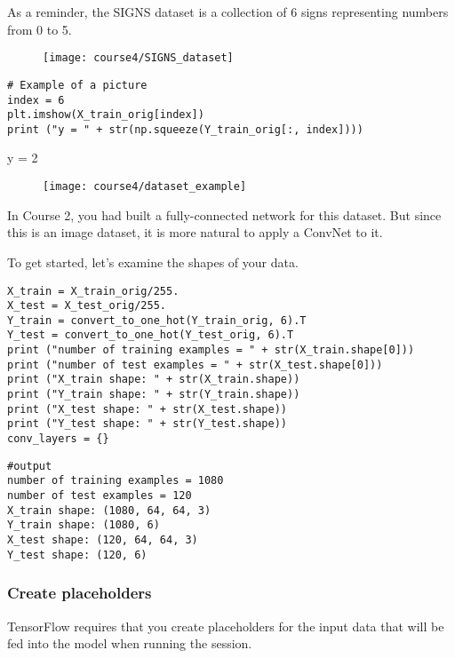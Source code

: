 As a reminder, the SIGNS dataset is a collection of 6 signs representing numbers from 0 to 5.
\clearpage
\begin{figure}[h]
\begin{center}
\texttt{[image: course4/SIGNS\_dataset]}
\end{center}
\end{figure}

\begin{verbatim}
# Example of a picture
index = 6
plt.imshow(X_train_orig[index])
print ("y = " + str(np.squeeze(Y_train_orig[:, index])))
\end{verbatim}
y = 2
\begin{figure}[h]
\begin{center}
\texttt{[image: course4/dataset\_example]}
\end{center}
\end{figure}


In Course 2, you had built a fully-connected network for this dataset. But since this is an image dataset, it is more natural to apply a ConvNet to it.

To get started, let's examine the shapes of your data.
\begin{verbatim}
X_train = X_train_orig/255.
X_test = X_test_orig/255.
Y_train = convert_to_one_hot(Y_train_orig, 6).T
Y_test = convert_to_one_hot(Y_test_orig, 6).T
print ("number of training examples = " + str(X_train.shape[0]))
print ("number of test examples = " + str(X_test.shape[0]))
print ("X_train shape: " + str(X_train.shape))
print ("Y_train shape: " + str(Y_train.shape))
print ("X_test shape: " + str(X_test.shape))
print ("Y_test shape: " + str(Y_test.shape))
conv_layers = {}
\end{verbatim}

\begin{verbatim}
#output
number of training examples = 1080
number of test examples = 120
X_train shape: (1080, 64, 64, 3)
Y_train shape: (1080, 6)
X_test shape: (120, 64, 64, 3)
Y_test shape: (120, 6)
\end{verbatim}


\subsubsection{Create placeholders}

TensorFlow requires that you create placeholders for the input data that will be fed into the model when running the session.

